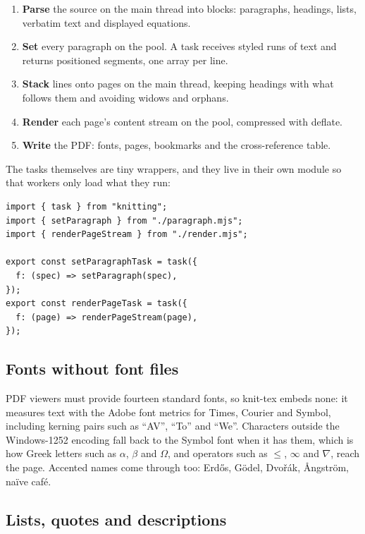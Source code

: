 \documentclass[10pt]{article}
\begin{document}
\begin{enumerate}
  \item \textbf{Parse} the source on the main thread into blocks: paragraphs,
        headings, lists, verbatim text and displayed equations.
  \item \textbf{Set} every paragraph on the pool. A task receives styled runs
        of text and returns positioned segments, one array per line.
  \item \textbf{Stack} lines onto pages on the main thread, keeping headings
        with what follows them and avoiding widows and orphans.
  \item \textbf{Render} each page's content stream on the pool, compressed
        with deflate.
  \item \textbf{Write} the PDF: fonts, pages, bookmarks and the cross-reference
        table.
\end{enumerate}

The tasks themselves are tiny wrappers, and they live in their own module so
that workers only load what they run:
\begin{verbatim}
import { task } from "knitting";
import { setParagraph } from "./paragraph.mjs";
import { renderPageStream } from "./render.mjs";

export const setParagraphTask = task({
  f: (spec) => setParagraph(spec),
});
export const renderPageTask = task({
  f: (page) => renderPageStream(page),
});
\end{verbatim}

\subsection{Fonts without font files}

PDF viewers must provide fourteen standard fonts, so knit-tex embeds none: it
measures text with the Adobe font metrics for Times, Courier and Symbol,
including kerning pairs such as ``AV'', ``To'' and ``We''. Characters outside
the Windows-1252 encoding fall back to the Symbol font when it has them, which
is how Greek letters such as $\alpha$, $\beta$ and $\Omega$, and operators such
as $\leq$, $\infty$ and $\nabla$, reach the page. Accented names come through
too: Erdős, Gödel, Dvořák, Ångström, naïve café.

\subsection{Lists, quotes and descriptions}
\end{document}

